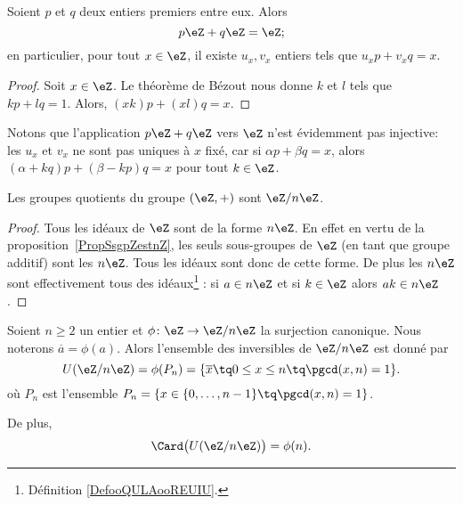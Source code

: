 \begin{corollary}       \label{CorgEMtLj}
	Soient \( p\) et \( q\) deux entiers premiers entre eux. Alors
	\begin{equation}
		p\eZ+q\eZ=\eZ;
	\end{equation}
	en particulier, pour tout \( x \in \eZ \), il existe \( u_x, v_x \) entiers tels que \(u_x p + v_x q = x \).
\end{corollary}

\begin{proof}
	Soit \( x\in \eZ\). Le théorème de Bézout nous donne \( k\) et \( l\) tels que \( kp+lq=1\). Alors, \( (xk)p+(xl)q=x\).
\end{proof}

Notons que l'application \( p\eZ+q\eZ\) vers \( \eZ\) n'est évidemment pas injective: les \( u_x\) et \( v_x\) ne sont pas uniques à \( x\) fixé, car si \( \alpha p+\beta q=x\), alors \( (\alpha+kq)p+(\beta-kp)q=x\) pour tout \( k\in \eZ\).


\begin{corollary}       \label{CORooLINXooBlUKPG}
	Les groupes quotients du groupe \( (\eZ,+)\) sont \( \eZ/n\eZ\).
\end{corollary}

\begin{proof}
	Tous les idéaux de \( \eZ\) sont de la forme \( n\eZ\). En effet en vertu de la proposition~\ref{PropSsgpZestnZ}, les seuls sous-groupes de \( \eZ\) (en tant que groupe additif) sont les \( n\eZ\). Tous les idéaux sont donc de cette forme. De plus les \( n\eZ\) sont effectivement tous des idéaux\footnote{Définition \ref{DefooQULAooREUIU}.} : si \( a\in n\eZ\) et si \( k\in \eZ\) alors \( ak\in n\eZ\).
\end{proof}

\begin{proposition}     \label{PropZpintssiprempUzn}
	Soient \( n\geq 2\) un entier et \( \phi\colon \eZ\to \eZ/n\eZ\) la surjection canonique. Nous noterons \( \overline a=\phi(a)\). Alors l'ensemble des inversibles de \( \eZ/n\eZ\) est donné par
	\begin{equation}
		U(\eZ/n\eZ)=\phi(P_n)=\{ \overline x\tq 0\leq x\leq n\tq\pgcd(x,n)=1 \}.
	\end{equation}
	où \( P_n\) est l'ensemble \( P_n=\{ x\in\{ 0,\ldots,n-1 \}\tq\pgcd(x,n)=1 \}\).

	De plus,
	\begin{equation}
		\Card\big( U(\eZ/n\eZ) \big)=\phi(n).
	\end{equation}
\end{proposition}

